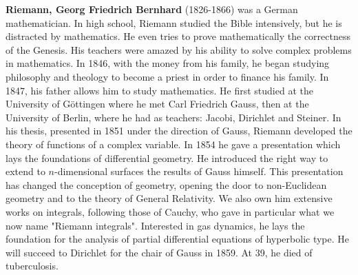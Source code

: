 \textbf{Riemann, Georg Friedrich Bernhard} (1826-1866) was a German mathematician. In high school, Riemann studied the Bible intensively, but he is distracted by mathematics. He even tries to prove mathematically the correctness of the Genesis. His teachers were amazed by his ability to solve complex problems in mathematics. In 1846, with the money from his family, he began studying philosophy and theology to become a priest in order to finance his family. In 1847, his father allows him to study mathematics. He first studied at the University of Göttingen where he met Carl Friedrich Gauss, then at the University of Berlin, where he had as teachers: Jacobi, Dirichlet and Steiner. In his thesis, presented in 1851 under the direction of Gauss, Riemann developed the theory of functions of a complex variable. In 1854 he gave a presentation which lays the foundations of differential geometry. He introduced the right way to extend to $n$-dimensional surfaces the results of Gauss himself. This presentation has changed the conception of geometry, opening the door to non-Euclidean geometry and to the theory of General Relativity. We also own him extensive works on integrals, following those of Cauchy, who gave in particular what we now name "Riemann integrals". Interested in gas dynamics, he lays the foundation for the analysis of partial differential equations of hyperbolic type. He will succeed to Dirichlet for the chair of Gauss in 1859. At 39, he died of tuberculosis.

{}
\label{sec:S}


